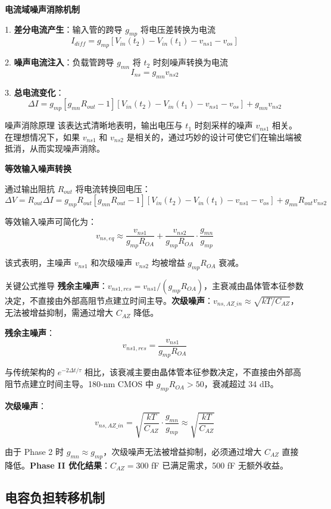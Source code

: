 \documentclass[11pt,a4paper,UTF8]{ctexart}
\begin{document}
\textbf{电流域噪声消除机制}

1. \textbf{差分电流产生}：输入管的跨导 $g_{mp}$ 将电压差转换为电流
   $$I_{diff} = g_{mp} [V_{in}(t_2) - V_{in}(t_1) - v_{ns1} - v_{os}]$$

2. \textbf{噪声电流注入}：负载管跨导 $g_{mn}$ 将 $t_2$ 时刻噪声转换为电流
   $$I_{ns} = g_{mn} v_{ns2}$$

3. \textbf{总电流变化}：
   $$\Delta I = g_{mp}[g_{mn}R_{out} - 1][V_{in}(t_2) - V_{in}(t_1) - v_{ns1} - v_{os}] + g_{mn}v_{ns2}$$

\begin{impbox}{噪声消除原理}
该表达式清晰地表明，输出电压与 $t_1$ 时刻采样的噪声 $v_{ns1}$ 相关。在理想情况下，如果 $v_{ns1}$ 和 $v_{ns2}$ 是相关的，通过巧妙的设计可使它们在输出端被抵消，从而实现噪声消除。
\end{impbox}

\textbf{等效输入噪声转换}

通过输出阻抗 $R_{out}$ 将电流转换回电压：
$$\Delta V = R_{out} \Delta I = g_{mp}R_{out}[g_{mn}R_{out} - 1][V_{in}(t_2) - V_{in}(t_1) - v_{ns1} - v_{os}] + g_{mn}R_{out}v_{ns2}$$

等效输入噪声可简化为：
$$v_{ns,eq} \approx \frac{v_{ns1}}{g_{mp}R_{OA}} + \frac{v_{ns2}}{g_{mp}R_{OA}} \cdot \frac{g_{mn}}{g_{mp}}$$

该式表明，主噪声 $v_{ns1}$ 和次级噪声 $v_{ns2}$ 均被增益 $g_{mp}R_{OA}$ 衰减。

\begin{prinbox}{关键公式推导}
\textbf{残余主噪声}：$v_{ns1,res} = v_{ns1}/(g_{mp}R_{OA})$，主衰减由晶体管本征参数决定，不直接由外部高阻节点建立时间主导。\textbf{次级噪声}：$v_{ns,AZ\_in} \approx \sqrt{kT/C_{AZ}}$，无法被增益抑制，需通过增大 $C_{AZ}$ 降低。
\end{prinbox}

\textbf{残余主噪声}：
$$v_{ns1,res} = \frac{v_{ns1}}{g_{mp}R_{OA}}$$

与传统架构的 $e^{-2\Delta t/\tau}$ 相比，该衰减主要由晶体管本征参数决定，不直接由外部高阻节点建立时间主导。180-nm CMOS 中 $g_{mp}R_{OA} > 50$，衰减超过 34 dB。

\textbf{次级噪声}：
$$v_{ns,AZ\_in} = \sqrt{\frac{kT}{C_{AZ}}} \cdot \frac{g_{mn}}{g_{mp}} \approx \sqrt{\frac{kT}{C_{AZ}}}$$

由于 Phase 2 时 $g_{mn} \approx g_{mp}$，次级噪声无法被增益抑制，必须通过增大 $C_{AZ}$ 直接降低。\textbf{Phase II 优化结果}：$C_{AZ}=300$ fF 已满足需求，500 fF 无额外收益。

\subsection{电容负担转移机制}
\end{document}

